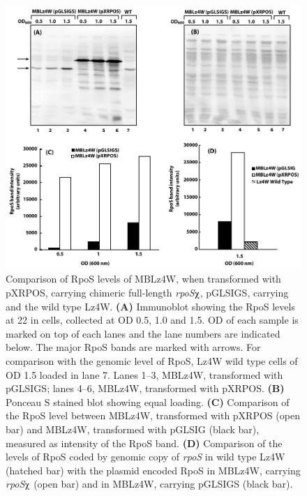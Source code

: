 \begin{figure}[tbp]
\begin{narrow}{-1.5in}{-1.5in}
\centering
\includegraphics{figures/chap6_chi_expression}
\end{narrow}
\caption[Comparison of plasmid borne RpoS levels]{Comparison of
RpoS levels of MBLz4W, when transformed with pXRPOS, carrying
chimeric full-length \emph{rpoS}$\chiup$, pGLSIGS, carrying
\lzsig{} and the wild type Lz4W. \textbf{(A)} Immunoblot showing
the RpoS levels at 22\dg{} in cells, collected at OD
0.5, 1.0 and 1.5. OD of each sample is marked on top of
each lanes and the lane numbers are indicated below. The major
RpoS bands are marked with arrows. For comparison with the genomic
level of RpoS, Lz4W wild type cells of OD 1.5 loaded in
lane 7. Lanes 1--3, MBLz4W, transformed with pGLSIGS; lanes 4--6,
MBLz4W, transformed with pXRPOS. \textbf{(B)} Ponceau S stained
blot showing equal loading. \textbf{(C)} Comparison of the RpoS
level between MBLz4W, transformed with pXRPOS (open bar) and
MBLz4W, transformed with pGLSIG (black bar), measured as intensity
of the RpoS band. \textbf{(D)} Comparison of the levels of RpoS
coded by genomic copy of \emph{rpoS} in wild type Lz4W (hatched
bar) with the plasmid encoded RpoS in MBLz4W, carrying
\emph{rpoS}$\chiup$ (open bar) and in MBLz4W, carrying pGLSIGS
(black bar).} \label{chi_expression}
\end{figure}


